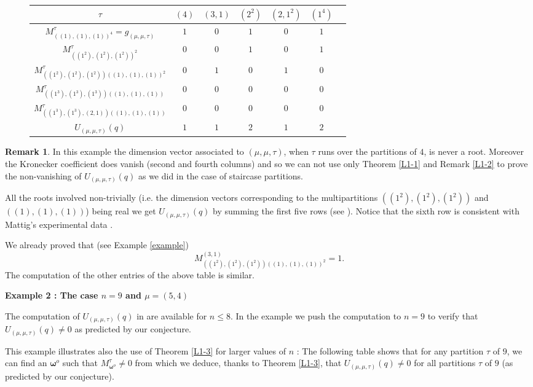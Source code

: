 \documentclass[11pt]{article}
\theoremstyle{definition}
\newtheorem{rema}[theo]{Remark}
\numberwithin{equation}{section}
\newcommand{\omegahat}{{\boldsymbol \omega}}
\begin{document}
\begin{figure}[h]
	\centering
	\begin{tabular}{|c|c|c|c|c|c|c|}
		\hline
		$\tau$ &$(4)$ 
		& $(3,1)$ 
		&$(2^2)$
		&$(2,1^2)$
		&$(1^4)$   \\
		\hline
		$M_{((1),(1),(1))^4}^{\tau}=g_{(\mu,\mu,\tau)}$ & $1$ &$0$&$1$&$0$&$1$\\ 
		\hline
		$M_{((1^2),(1^2),(1^2))^2}^\tau$ &$0$&$0$&$1$&$0$&$1$\\
		\hline
		$M_{((1^2),(1^2),(1^2))((1),(1),(1))^2}^\tau$ & $0$ &$1$&$0$&$1$&$0$\\ 
		\hline
		$M_{((1^3),(1^3),(1^3))((1),(1),(1))}^\tau$ & $0$ &$0$&$0$&$0$&$0$\\ 
		\hline
		$M_{((1^3),(1^3),(2,1))((1),(1),(1))}^\tau$ & $0$ &$0$&$0$&$0$&$0$\\ 
		\hline
		\hline
		$U_{(\mu,\mu,\tau)}(q)$&$1$&$1$&$2$&$1$&$2$\\
		\hline
	\end{tabular}
\end{figure}

\begin{rema}In this example the dimension vector associated to $(\mu,\mu,\tau)$, when $\tau$ runs over the partitions of $4$, is never a root. Moreover the Kronecker coefficient does vanish (second and fourth columns) and so we can not  use only Theorem \ref{L1-1} and Remark \ref{L1-2} to prove the non-vanishing of $U_{(\mu,\mu,\tau)}(q)$ as  we did in the case of staircase partitions.
\end{rema}

All the roots involved non-trivially (i.e. the dimension vectors corresponding to the multipartitions $((1^2),(1^2),(1^2))$ and $((1),(1),(1))$) being real we get $U_{(\mu,\mu,\tau)}(q)$  by summing the first five rows (see  \cite[Formula (17), Proposition 27]{L1}). Notice that the sixth row  is consistent with Mattig's experimental data \cite{Lu}.

We already proved that (see Example \ref{example})
$$
M_{((1^2),(1^2),(1^2))((1),(1),(1))^2}^{(3,1)}=1.
$$
The computation of the other entries of the above table is similar.


{\bf Example 2 : The case $n=9$ and $\mu=(5,4)$}


The computation of $U_{(\mu,\mu,\tau)}(q)$ in \cite{Lu} are available for $n\leq 8$.  In the example we push the computation to $n=9$ to verify that $U_{(\mu,\mu,\tau)}(q)\neq 0$ as predicted by our conjecture. 

This example illustrates also the use of Theorem \ref{L1-3} for larger values of $n$ : The following table shows that for any partition $\tau$ of $9$, we can find an $\omegahat^o$ such that $M_{\omegahat^o}^\tau\neq 0$ from which we deduce, thanks to Theorem \ref{L1-3}, that  $U_{(\mu,\mu,\tau)}(q)\neq 0$ for all partitions $\tau$ of $9$ (as predicted by our conjecture). 
\end{document}
